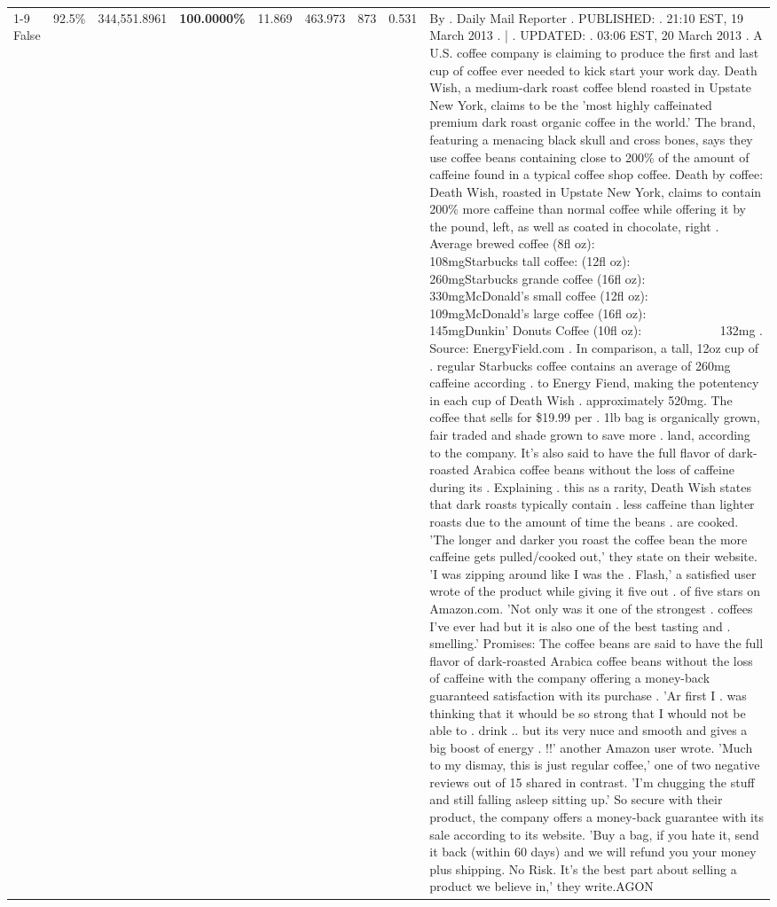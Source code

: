 \begin{table}[H]
{\begin{tabular}{lllrlllll}
\cline{1-9}
False & 92.5\% & 344,551.8961 & \bfseries \color{red} 100.0000\% & 11.869 & 463.973 & 873 & 0.531 & By . Daily Mail Reporter . PUBLISHED: . 21:10 EST, 19 March 2013 . | . UPDATED: . 03:06 EST, 20 March 2013 . A U.S. coffee company is claiming to produce the first and last cup of coffee ever needed to kick start your work day. Death Wish, a medium-dark roast coffee blend roasted in Upstate New York, claims to be the 'most highly caffeinated premium dark roast organic coffee in the world.' The brand, featuring a menacing black skull and cross bones, says they use coffee beans containing close to 200\% of the amount of caffeine found in a typical coffee shop coffee. Death by coffee: Death Wish, roasted in Upstate New York, claims to contain 200\% more caffeine than normal coffee while offering it by the pound, left, as well as coated in chocolate, right . Average brewed coffee (8fl oz):              108mgStarbucks tall coffee: (12fl oz):                260mgStarbucks grande coffee (16fl oz):         330mgMcDonald's small coffee (12fl oz):           109mgMcDonald's large coffee (16fl oz):           145mgDunkin' Donuts Coffee (10fl oz):             132mg . Source: EnergyField.com . In comparison, a tall, 12oz cup of . regular Starbucks coffee contains an average of 260mg caffeine according . to Energy Fiend, making the potentency in each cup of Death Wish . approximately 520mg. The coffee that sells for \$19.99 per . 1lb bag is organically grown, fair traded and shade grown to save more . land, according to the company. It's also said to have the full flavor of dark-roasted Arabica coffee beans without the loss of caffeine during its . Explaining . this as a rarity, Death Wish states that dark roasts typically contain . less caffeine than lighter roasts due to the amount of time the beans . are cooked. 'The longer and darker you roast the coffee bean the more caffeine gets pulled/cooked out,' they state on their website. 'I was zipping around like I was the . Flash,' a satisfied user wrote of the product while giving it five out . of five stars on Amazon.com. 'Not only was it one of the strongest . coffees I've ever had but it is also one of the best tasting and . smelling.’ Promises: The coffee beans are said to have the full flavor of dark-roasted Arabica coffee beans without the loss of caffeine with the company offering a money-back guaranteed satisfaction with its purchase . 'Ar first I . was thinking that it whould be so strong that I whould not be able to . drink .. but its very nuce and smooth and gives a big boost of energy . !!' another Amazon user wrote. 'Much to my dismay, this is just regular coffee,' one of two negative reviews out of 15 shared in contrast. 'I'm chugging the stuff and still falling asleep sitting up.' So secure with their product, the company offers a money-back guarantee with its sale according to its website. 'Buy a bag, if you hate it, send it back (within 60 days) and we will refund you your money plus shipping. No Risk. It’s the best part about selling a product we believe in,' they write.AGON \\

\end{tabular}}
\end{table}
